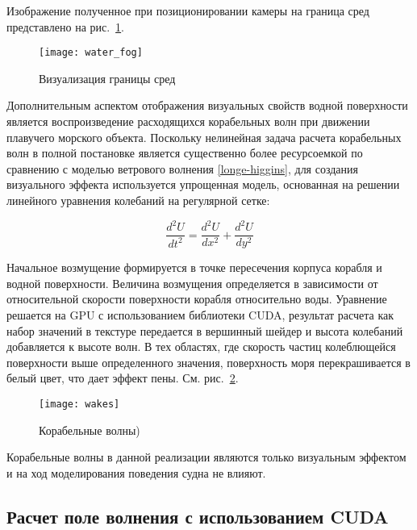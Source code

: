 Изображение полученное при позиционировании камеры на граница сред представлено на рис.~\ref{water_fog}.

\begin{figure}[ht]
\begin{center}
\texttt{[image: water\_fog]}
\end{center}
\caption{Визуализация границы сред}
\label{water_fog}
\end{figure}



Дополнительным аспектом отображения визуальных свойств водной поверхности является воспроизведение расходящихся корабельных волн при движении плавучего морского объекта. Поскольку нелинейная задача расчета корабельных волн в полной постановке является существенно более ресурсоемкой по сравнению с моделью ветрового волнения \eqref{longe-higgins}, для создания визуального эффекта используется упрощенная модель, основанная на решении линейного уравнения колебаний на регулярной сетке:

\begin{equation}
	\label{wake_equation}
	\frac{d^2U}{dt^2} = \frac{d^2U}{dx^2} +  \frac{d^2U}{dy^2}
\end{equation}

Начальное возмущение формируется в точке пересечения корпуса корабля и водной поверхности. Величина возмущения определяется в зависимости от относительной скорости поверхности корабля относительно воды. Уравнение решается на GPU с использованием библиотеки CUDA, результат расчета как набор значений в текстуре передается в вершинный шейдер и высота колебаний добавляется к высоте волн. В тех областях, где скорость частиц колеблющейся поверхности выше определенного значения, поверхность моря перекрашивается в белый цвет, что дает эффект пены. См. рис.~\ref{wakes}.

\begin{figure}[ht]
\begin{center}
\texttt{[image: wakes]}
\end{center}
\caption{Корабельные волны)}
\label{wakes}
\end{figure}

Корабельные волны в данной реализации являются только визуальным эффектом и на ход моделирования поведения судна не влияют.



\subsection{Расчет поле волнения с использованием CUDA}

